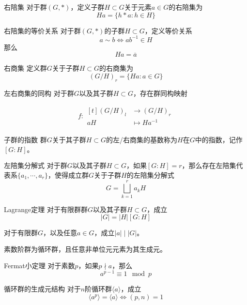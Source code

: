 \documentclass[lang = cn, scheme = chinese, thmcnt = section]{elegantbook}
\newcommand{\rang}{\rangle}            %
\newcommand{\function}[5]{
	\begin{align*}
		#1:\begin{aligned}[t]
			#2 &\longrightarrow #3\\
			#4 &\longmapsto #5
		\end{aligned}
	\end{align*}
}                                     %
\begin{document}
\begin{definition}{右陪集}
	对于群$(G,*)$，定义子群$H\subset G$关于元素$a\in G$的右陪集为
	$$
	Ha=\{ h*a:h\in H \}
	$$
\end{definition}

\begin{theorem}{右陪集的等价关系}
	对于群$(G,*)$的子群$H\subset G$，定义等价关系
	$$
	a\sim b\iff ab^{-1}\in H
	$$
	那么
	$$
	Ha=\overline{a}
	$$
\end{theorem}

\begin{definition}{右商集}
	定义群$G$关于子群$H\subset G$的右商集为
	$$
	(G/H)_r=\{ Ha:a\in G \}
	$$
\end{definition}

\begin{theorem}{左右商集的同构}
	对于群$G$以及其子群$H\subset G$，存在群同构映射
	\function{f}{(G/H)_l}{(G/H)_r}{aH}{Ha^{-1}}
\end{theorem}

\begin{definition}{子群的指数}
	群$G$关于其子群$H\subset G$的左/右商集的基数称为$H$在$G$中的指数，记作$[G:H]$。
\end{definition}

\begin{definition}{左陪集分解式}
	对于群$G$以及其子群$H\subset G$，如果$[G:H]=r$，那么存在左陪集代表系$\{ a_1,\cdots,a_r \}$，使得成立群$G$关于子群$H$的左陪集分解式
	$$
	G=\bigsqcup_{k=1}^{r}a_kH
	$$
\end{definition}

\begin{theorem}{Lagrange定理}
	对于有限群群$G$以及其子群$H\subset G$，成立
	$$
	|G|=|H|[G:H]
	$$
\end{theorem}

\begin{corollary}
	对于有限群$G$，以及任意$a\in G$，成立$|a|\mid |G|$。
\end{corollary}

\begin{corollary}
	素数阶群为循环群，且任意非单位元元素为其生成元。
\end{corollary}

\begin{theorem}{Fermat小定理}
	对于素数$p$，如果$p\nmid a$，那么
	$$
	a^{p-1}\equiv  1\mod{p}
	$$
\end{theorem}

\begin{proposition}{循环群的生成元结构}
	对于$n$阶循环群$\langle a \rang$，成立
	$$
	\langle a^p \rang=\langle a \rang \iff (p,n)=1
	$$
\end{proposition}
\end{document}
